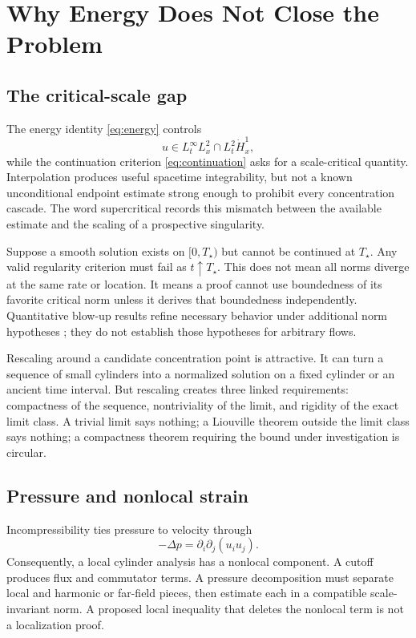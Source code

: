 \documentclass[conference]{../../../../Conference-LaTeX-template_10-17-19/IEEEtran}
\begin{document}
\section{Why Energy Does Not Close the Problem}
\subsection{The critical-scale gap}
The energy identity \eqref{eq:energy} controls
\begin{equation}
u\in L_t^\infty L_x^2\cap L_t^2\dot H_x^1,
\label{eq:energyclass}
\end{equation}
while the continuation criterion \eqref{eq:continuation} asks for a scale-critical quantity. Interpolation produces useful spacetime integrability, but not a known unconditional endpoint estimate strong enough to prohibit every concentration cascade. The word supercritical records this mismatch between the available estimate and the scaling of a prospective singularity.

Suppose a smooth solution exists on $[0,T_\star)$ but cannot be continued at $T_\star$. Any valid regularity criterion must fail as $t\uparrow T_\star$. This does not mean all norms diverge at the same rate or location. It means a proof cannot use boundedness of its favorite critical norm unless it derives that boundedness independently. Quantitative blow-up results refine necessary behavior under additional norm hypotheses \cite{barkerprange}; they do not establish those hypotheses for arbitrary flows.

Rescaling around a candidate concentration point is attractive. It can turn a sequence of small cylinders into a normalized solution on a fixed cylinder or an ancient time interval. But rescaling creates three linked requirements: compactness of the sequence, nontriviality of the limit, and rigidity of the exact limit class. A trivial limit says nothing; a Liouville theorem outside the limit class says nothing; a compactness theorem requiring the bound under investigation is circular.

\subsection{Pressure and nonlocal strain}
Incompressibility ties pressure to velocity through
\begin{equation}
-\Delta p=\partial_i\partial_j(u_i u_j).
\label{eq:pressure}
\end{equation}
Consequently, a local cylinder analysis has a nonlocal component. A cutoff produces flux and commutator terms. A pressure decomposition must separate local and harmonic or far-field pieces, then estimate each in a compatible scale-invariant norm. A proposed local inequality that deletes the nonlocal term is not a localization proof.
\end{document}
